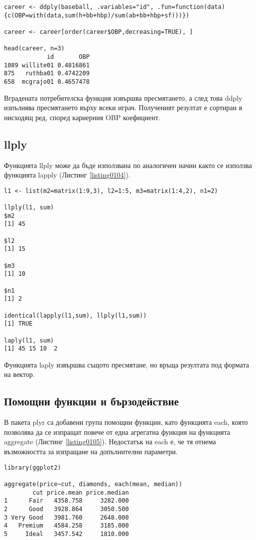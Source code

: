 \begin{lstlisting}[caption=Пресмятане на OBP за цялата кариера на играча, label=listing0103]
career <- ddply(baseball, .variables="id", .fun=function(data){c(OBP=with(data,sum(h+bb+hbp)/sum(ab+bb+hbp+sf)))})

career <- career[order(career$OBP,decreasing=TRUE), ]

head(career, n=3)
            id       OBP
1089 willite01 0.4816861
875   ruthba01 0.4742209
658  mcgrajo01 0.4657478
\end{lstlisting}

Вградената потребителска функция извършва пресмятането, а след това ddply изпълнява пресмятането върху всеки играч. Полученият резултат е сортиран в нисходящ ред, според кариерния OBP коефициент.

\subsection{llply}

Функцията llply може да бъде използвана по аналогичен начин както се използва функцията lapply (Листинг \ref{listing0104}).

\begin{lstlisting}[caption=Сума на всеки елемент в списък, label=listing0104]
l1 <- list(m2=matrix(1:9,3), l2=1:5, m3=matrix(1:4,2), n1=2)

llply(l1, sum)
$m2
[1] 45

$l2
[1] 15

$m3
[1] 10

$n1
[1] 2

identical(lapply(l1,sum), llply(l1,sum))
[1] TRUE

laply(l1, sum)
[1] 45 15 10  2
\end{lstlisting}

Функцията laply извършва същото пресмятане, но връща резултата под формата на вектор. 

\subsection{Помощни функции и бързодействие}

В пакета plyr са добавени група помощни функции, като функцията each, която позволява да се изпращат повече от една агрегатна функция на функцията aggregate (Листинг \ref{listing0105}). Недостатък на each е, че тя отнема възможността за изпращане на допълнителни параметри. 

\begin{lstlisting}[caption=Повече от една агрегатни функции, label=listing0105]
library(ggplot2)

aggregate(price~cut, diamonds, each(mean, median))
        cut price.mean price.median
1      Fair   4358.758     3282.000
2      Good   3928.864     3050.500
3 Very Good   3981.760     2648.000
4   Premium   4584.258     3185.000
5     Ideal   3457.542     1810.000
\end{lstlisting}

